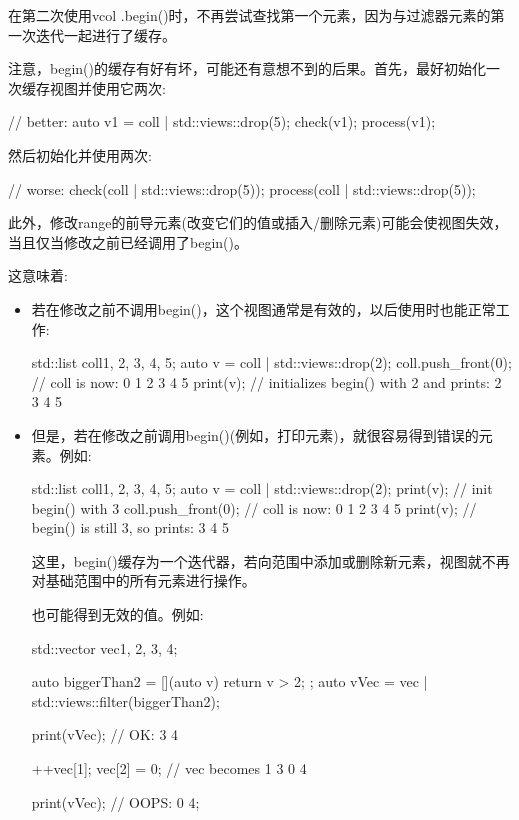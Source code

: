 在第二次使用vcol .begin()时，不再尝试查找第一个元素，因为与过滤器元素的第一次迭代一起进行了缓存。

注意，begin()的缓存有好有坏，可能还有意想不到的后果。首先，最好初始化一次缓存视图并使用它两次:

\begin{cpp}
// better:
auto v1 = coll | std::views::drop(5);
check(v1);
process(v1);
\end{cpp}

然后初始化并使用两次:

\begin{cpp}
// worse:
check(coll | std::views::drop(5));
process(coll | std::views::drop(5));
\end{cpp}

此外，修改range的前导元素(改变它们的值或插入/删除元素)可能会使视图失效，当且仅当修改之前已经调用了begin()。

这意味着:

\begin{itemize}
\item
若在修改之前不调用begin()，这个视图通常是有效的，以后使用时也能正常工作:

\begin{cpp}
std::list coll{1, 2, 3, 4, 5};
auto v = coll | std::views::drop(2);
coll.push_front(0); // coll is now: 0 1 2 3 4 5
print(v); // initializes begin() with 2 and prints: 2 3 4 5
\end{cpp}

\item
但是，若在修改之前调用begin()(例如，打印元素)，就很容易得到错误的元素。例如:

\begin{cpp}
std::list coll{1, 2, 3, 4, 5};
auto v = coll | std::views::drop(2);
print(v); // init begin() with 3
coll.push_front(0); // coll is now: 0 1 2 3 4 5
print(v); // begin() is still 3, so prints: 3 4 5
\end{cpp}

这里，begin()缓存为一个迭代器，若向范围中添加或删除新元素，视图就不再对基础范围中的所有元素进行操作。

也可能得到无效的值。例如:

\begin{cpp}
std::vector vec{1, 2, 3, 4};

auto biggerThan2 = [](auto v){ return v > 2; };
auto vVec = vec | std::views::filter(biggerThan2);

print(vVec); // OK: 3 4

++vec[1];
vec[2] = 0; // vec becomes 1 3 0 4

print(vVec); // OOPS: 0 4;
\end{cpp}

\end{itemize}

